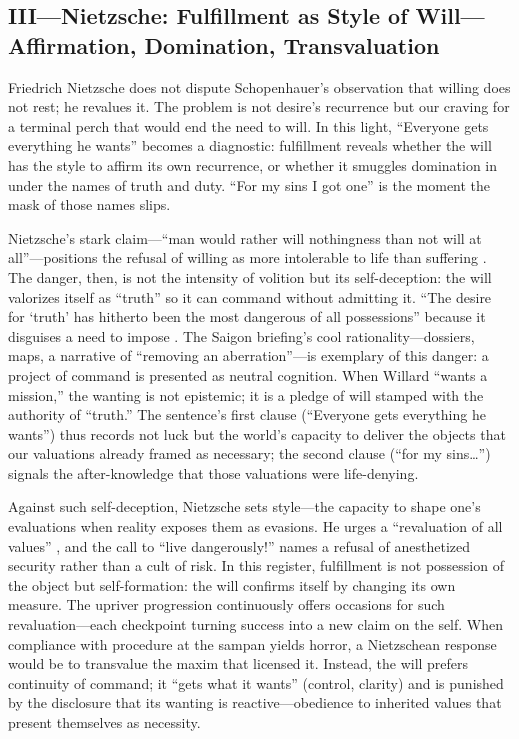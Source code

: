 \subsection*{III—Nietzsche: Fulfillment as Style of Will—Affirmation, Domination, Transvaluation}
\label{ssec:iii-nietzsche}
Friedrich Nietzsche does not dispute Schopenhauer's observation that willing does not rest; he
revalues it. The problem is not desire's recurrence but our craving for a terminal perch that
would end
the need to will. In this light, ``Everyone gets everything he wants'' becomes a diagnostic:
fulfillment reveals whether the will has the style to affirm its own recurrence, or whether it
smuggles domination in under the names of truth and duty. ``For my sins I got one'' is the
moment the mask of those names slips.

Nietzsche's stark claim—``man would rather will nothingness than not will at all''—positions
the refusal of willing as more intolerable to life than suffering
\parencite[III.28, p.~162]{NietzscheGenealogy1994}. The danger, then, is not the intensity of
volition but its self-deception: the will valorizes itself as ``truth'' so it can command
without admitting it. ``The desire for `truth' has hitherto been the most dangerous of all
possessions'' because it disguises a need to impose \parencite[\S 34]{NietzscheBGE1990}.
The Saigon briefing's cool rationality—dossiers, maps, a narrative of ``removing an
aberration''—is exemplary of this danger: a project of command is presented as neutral cognition.
When Willard ``wants a mission,'' the wanting is not epistemic; it is a pledge of will stamped
with the authority of ``truth.'' The sentence's first clause (``Everyone gets everything he
wants'') thus records not luck but the world's capacity to deliver the objects that our
valuations already framed as necessary; the second clause (``for my sins\ldots'') signals
the after-knowledge that those valuations were life-denying.

Against such self-deception, Nietzsche sets style—the capacity to shape one's evaluations when
reality exposes them as evasions. He urges a ``revaluation of all values''
\parencite[\S\S 203--211]{NietzscheBGE1990}, and the call to ``live dangerously!''
\parencite[\S 283]{NietzscheBGE1990} names a refusal of anesthetized security rather than a
cult of risk. In this register, fulfillment is not possession of the object but self-formation:
the will confirms itself by changing its own measure. The upriver progression continuously
offers occasions for such revaluation—each checkpoint turning success into a new claim on the
self. When compliance with procedure at the sampan yields horror, a Nietzschean response would
be to transvalue the maxim that licensed it. Instead, the will prefers continuity of command;
it ``gets what it wants'' (control, clarity) and is punished by the disclosure that its wanting
is reactive—obedience to inherited values that present themselves as necessity.

